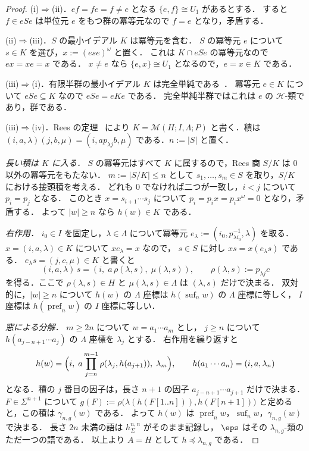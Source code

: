 \begin{proof}
(i)$\Rightarrow$(ii)．$ef=fe=f\ne e$ となる $\{e,f\}\cong U_1$ があるとする．
すると $f\in eSe$ は単位元 $e$ をもつ群の冪等元なので $f=e$ となり，矛盾する．

(ii)$\Rightarrow$(iii)．$S$ の最小イデアル $K$ は冪等元を含む．
$S$ の冪等元 $e$ について $s\in K$ を選び，$x:=(ese)^\omega$ と置く．
これは $K\cap eSe$ の冪等元なので $ex=xe=x$ である．
$x\ne e$ なら $\{e,x\}\cong U_1$ となるので，$e=x\in K$ である．

(iii)$\Rightarrow$(i)．有限半群の最小イデアル $K$ は完全単純である~\cite{Howie1995}．
冪等元 $e\in K$ について $eSe\subseteq K$ なので $eSe=eKe$ である．
完全単純半群ではこれは $e$ の $\mathcal H$-類であり，群である．

(iii)$\Rightarrow$(iv)．Rees の定理~\cite{Howie1995} により
$K=\mathcal M(H;I,\Lambda;P)$ と書く．積は
$(i,a,\lambda)(j,b,\mu)=(i,ap_{\lambda j}b,\mu)$ である．$n:=|S|$ と置く．

\emph{長い積は $K$ に入る．}
$S$ の冪等元はすべて $K$ に属するので，Rees 商 $S/K$ は $0$ 以外の冪等元をもたない．
$m:=|S/K|\le n$ として $s_1,\ldots,s_m\in S$ を取り，$S/K$ における接頭積を考える．
どれも $0$ でなければ二つが一致し，$i<j$ について $p_i=p_j$ となる．
このとき $x=s_{i+1}\cdots s_j$ について $p_i=p_ix=p_ix^\omega=0$ となり，矛盾する．
よって $|w|\ge n$ なら $h(w)\in K$ である．

\emph{右作用．}
$i_0\in I$ を固定し，$\lambda\in\Lambda$ について冪等元
$e_\lambda:=(i_0,p_{\lambda i_0}^{-1},\lambda)$ を取る．
$x=(i,a,\lambda)\in K$ について $xe_\lambda=x$ なので，
$s\in S$ に対し $xs=x(e_\lambda s)$ である．
$e_\lambda s=(j,c,\mu)\in K$ と書くと
\[
 (i,a,\lambda)\,s=(i,\;a\,\rho(\lambda,s),\;\mu(\lambda,s)),
 \qquad \rho(\lambda,s):=p_{\lambda j}c
\]
を得る．ここで $\rho(\lambda,s)\in H$ と $\mu(\lambda,s)\in\Lambda$ は $(\lambda,s)$ だけで決まる．
双対的に，$|w|\ge n$ について $h(w)$ の $\Lambda$ 座標は $h(\operatorname{suf}_n w)$ の $\Lambda$ 座標に等しく，
$I$ 座標は $h(\operatorname{pref}_n w)$ の $I$ 座標に等しい．

\emph{窓による分解．}
$m\ge2n$ について $w=a_1\cdots a_m$ とし，
$j\ge n$ について $h(a_{j-n+1}\cdots a_j)$ の $\Lambda$ 座標を $\lambda_j$ とする．
右作用を繰り返すと
\[
 h(w)=\Bigl(i,\;a\prod_{j=n}^{m-1}\rho(\lambda_j,h(a_{j+1})),\;
 \lambda_m\Bigr),
 \qquad h(a_1\cdots a_n)=(i,a,\lambda_n)
\]
となる．積の $j$ 番目の因子は，長さ $n+1$ の因子 $a_{j-n+1}\cdots a_{j+1}$ だけで決まる．
$F\in\Sigma^{n+1}$ について
$g(F):=\rho\bigl(\lambda(h(F[1..n])),h(F[n+1])\bigr)$ と定めると，この積は $\gamma_{n,g}(w)$ である．
よって $h(w)$ は $\operatorname{pref}_n w$，$\operatorname{suf}_n w$，$\gamma_{n,g}(w)$ で決まる．
長さ $2n$ 未満の語は $h^{n,n}_\Sigma$ がそのまま記録し，
$\eps$ はその $\lambda_{n,g}$-類のただ一つの語である．
以上より $A=H$ として $h\preceq\lambda_{n,g}$ である．


\end{proof}
